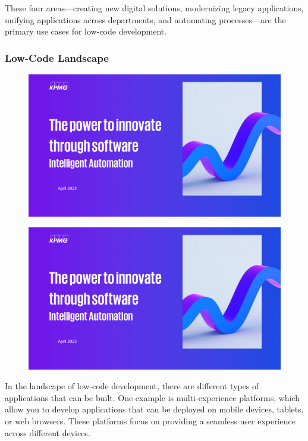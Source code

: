 These four areas---creating new digital solutions, modernizing legacy
applications, unifying applications across departments, and automating
processes---are the primary use cases for low-code development.

\subsubsection{Low-Code Landscape}\label{low-code-landscape}

\begin{figure}[!h]
  \centering
  \includegraphics[page=14, trim = 2cm 2cm 2cm 0cm, clip, width=\imagewidth]{images/02 - KPMG_intelligent_automation_2.pdf}
\end{figure}

\begin{figure}[!h]
  \centering
  \includegraphics[page=15, trim = 2cm 2cm 2cm 0cm, clip, width=\imagewidth]{images/02 - KPMG_intelligent_automation_2.pdf}
\end{figure}

In the landscape of low-code development, there are different types of
applications that can be built. One example is multi-experience
platforms, which allow you to develop applications that can be deployed
on mobile devices, tablets, or web browsers. These platforms focus on
providing a seamless user experience across different devices.

